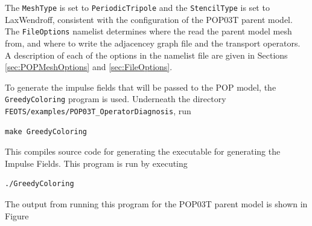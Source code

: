 \documentclass{softwaremanual}
\begin{document}
The \texttt{MeshType} is set to \texttt{PeriodicTripole} and the \texttt{StencilType} is set to LaxWendroff, consistent with the configuration of the POP03T parent model. The \texttt{FileOptions} namelist determines where the read the parent model mesh from, and where to write the adjacencey graph file and the transport operators. A description of each of the options in the namelist file are given in Sections \ref{sec:POPMeshOptions} and \ref{sec:FileOptions}.

To generate the impulse fields that will be passed to the POP model, the \texttt{GreedyColoring} program is used. Underneath the directory \texttt{FEOTS/examples/POP03T\_OperatorDiagnosis}, run
\begin{verbatim}
make GreedyColoring
\end{verbatim}
This compiles source code for generating the executable for generating the Impulse Fields. This program is run by executing
\begin{verbatim}
./GreedyColoring
\end{verbatim}
The output from running this program for the POP03T parent model is shown in Figure



\pagebreak
\end{document}
